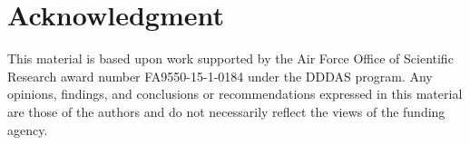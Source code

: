 \documentclass[twocolumn]{svjour3}
\begin{document}
\section{Acknowledgment} 
\noindent
This material is based upon work supported by the Air Force Office of Scientific Research award number FA9550-15-1-0184 under the DDDAS program. Any opinions, findings, and conclusions or recommendations expressed in this material are those of the authors and do not necessarily reflect the views of the funding agency.



%








\newpage
\newpage


\end{document}
